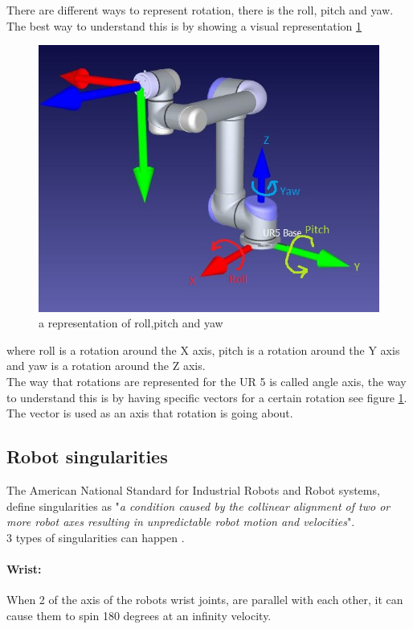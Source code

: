 There are different ways to represent rotation, there is the roll, pitch and yaw. The best way to understand this is by showing a visual representation \ref{fig:rpy-rep}
\begin{figure}[H]
    \centering
    \includegraphics[width=\textwidth]{Design/UR5RPY.JPG}
    \caption{a representation of roll,pitch and yaw\cite{CHRobotics}}
    \label{fig:rpy-rep}
\end{figure}

where roll is a rotation around the X axis, pitch is a rotation around the Y axis and yaw is a rotation around the Z axis\cite{JohnC}.\\
The way that rotations are represented for the UR 5 is called angle axis, the way to understand this is by having specific vectors for a certain rotation see figure \ref{fig:rpy-rep}. The vector is used as an axis that rotation is going about\cite{JohnC}.

\subsection{Robot singularities}
The American National Standard for Industrial Robots and Robot systems, define singularities as "\textit{a condition caused by the collinear alignment of two or more robot axes resulting in unpredictable robot motion and velocities}\cite{3Sing}".\\
3 types of singularities can happen \cite{3Sing}.

\paragraph{Wrist:} When 2 of the axis of the robots wrist joints, are parallel with each other, it can cause them to spin 180 degrees at an infinity velocity.
